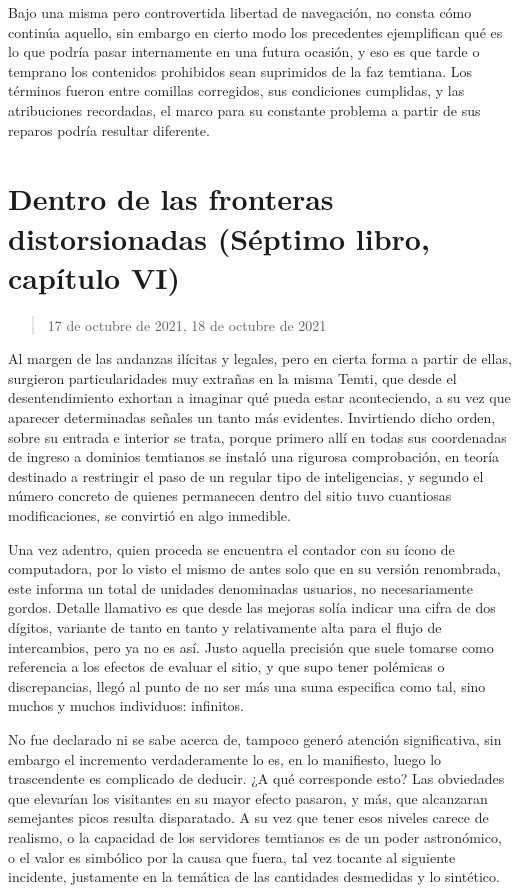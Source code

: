 \documentclass[
]{book}
\begin{document}
Bajo una misma pero controvertida libertad de navegación, no consta cómo continúa aquello, sin embargo en cierto modo los precedentes ejemplifican qué es lo que podría pasar internamente en una futura ocasión, y eso es que tarde o temprano los contenidos prohibidos sean suprimidos de la faz temtiana. Los términos fueron entre comillas corregidos, sus condiciones cumplidas, y las atribuciones recordadas, el marco para su constante problema a partir de sus reparos podría resultar diferente.

\hypertarget{dentro-de-las-fronteras-distorsionadas-suxe9ptimo-libro-capuxedtulo-vi}{%
\section{Dentro de las fronteras distorsionadas (Séptimo libro, capítulo VI)}\label{dentro-de-las-fronteras-distorsionadas-suxe9ptimo-libro-capuxedtulo-vi}}

\begin{quote}
17 de octubre de 2021, 18 de octubre de 2021
\end{quote}

Al margen de las andanzas ilícitas y legales, pero en cierta forma a partir de ellas, surgieron particularidades muy extrañas en la misma Temti, que desde el desentendimiento exhortan a imaginar qué pueda estar aconteciendo, a su vez que aparecer determinadas señales un tanto más evidentes. Invirtiendo dicho orden, sobre su entrada e interior se trata, porque primero allí en todas sus coordenadas de ingreso a dominios temtianos se instaló una rigurosa comprobación, en teoría destinado a restringir el paso de un regular tipo de inteligencias, y segundo el número concreto de quienes permanecen dentro del sitio tuvo cuantiosas modificaciones, se convirtió en algo inmedible.

Una vez adentro, quien proceda se encuentra el contador con su ícono de computadora, por lo visto el mismo de antes solo que en su versión renombrada, este informa un total de unidades denominadas usuarios, no necesariamente gordos. Detalle llamativo es que desde las mejoras solía indicar una cifra de dos dígitos, variante de tanto en tanto y relativamente alta para el flujo de intercambios, pero ya no es así. Justo aquella precisión que suele tomarse como referencia a los efectos de evaluar el sitio, y que supo tener polémicas o discrepancias, llegó al punto de no ser más una suma especifica como tal, sino muchos y muchos individuos: infinitos.

No fue declarado ni se sabe acerca de, tampoco generó atención significativa, sin embargo el incremento verdaderamente lo es, en lo manifiesto, luego lo trascendente es complicado de deducir. ¿A qué corresponde esto? Las obviedades que elevarían los visitantes en su mayor efecto pasaron, y más, que alcanzaran semejantes picos resulta disparatado. A su vez que tener esos niveles carece de realismo, o la capacidad de los servidores temtianos es de un poder astronómico, o el valor es simbólico por la causa que fuera, tal vez tocante al siguiente incidente, justamente en la temática de las cantidades desmedidas y lo sintético.
\end{document}
